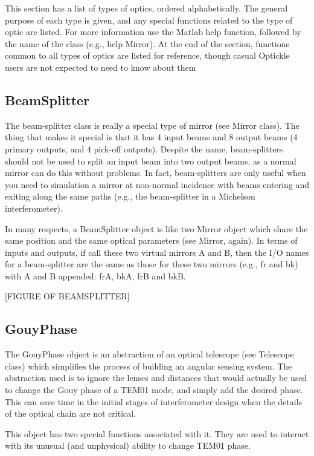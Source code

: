 \documentclass[12pt]{article}
\begin{document}
This section has a list of types of optics, ordered alphabetically.
The general purpose of each type is given, and any special functions related to the type of optic are listed.
For more information use the Matlab help function, followed by the name of the class (e.g., help Mirror).
At the end of the section, functions common to all types of optics are listed for reference, though casual Optickle users are not expected to need to know about them

\subsection{BeamSplitter}

The beam-splitter class is really a special type of mirror (see Mirror class).
The thing that makes it special is that it has 4 input beams and 8 output beams (4 primary outputs, and 4 pick-off outputs).
Despite the name, beam-splitters should not be used to split an input beam into two output beams, as a normal mirror can do this without problems.
In fact, beam-splitters are only useful when you need to simulation a mirror at non-normal incidence with beams entering and exiting along the same paths (e.g., the beam-splitter in a Michelson interferometer).

In many respects, a BeamSplitter object is like two Mirror object which share the same position and the same optical parameters (see Mirror, again).
In terms of inputs and outputs, if call these two virtual mirrors A and B, then the I/O names for a beam-splitter are the same as those for these two mirrors (e.g., fr and bk) with A and B appended: frA, bkA, frB and bkB.

[FIGURE OF BEAMSPLITTER]

\subsection{GouyPhase}

The GouyPhase object is an abstraction of an optical telescope (see Telescope class)
 which simplifies the process of building an angular sensing system.
The abstraction used is to ignore the lenses and distances that would actually be used to change the Gouy phase of a TEM01 mode, and simply add the desired phase.
This can save time in the initial stages of interferometer design when the details of the optical chain are not critical.

This object has two special functions associated with it.
They are used to interact with its unusual (and unphysical) ability to change TEM01 phase.
\end{document}

